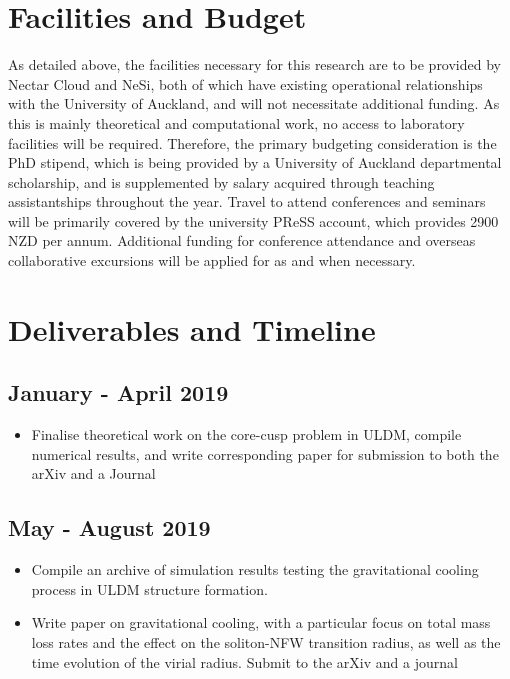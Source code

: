 \section{Facilities and Budget}

As detailed above, the facilities necessary for this research are to be provided by Nectar Cloud and NeSi, both of which have existing operational relationships with the University of Auckland, and will not necessitate additional funding. As this is mainly theoretical and computational work, no access to laboratory facilities will be required. Therefore, the primary budgeting consideration is the PhD stipend, which is being provided by a University of Auckland departmental scholarship, and is supplemented by salary acquired through teaching assistantships throughout the year. Travel to attend conferences and seminars will be primarily covered by the university PReSS account, which provides 2900 NZD per annum. Additional funding for conference attendance and overseas collaborative excursions will be applied for as and when necessary. 


\section{Deliverables and Timeline}

\subsection*{January - April 2019}
\begin{itemize}
    \item Finalise theoretical work on the core-cusp problem in ULDM, compile numerical results, and write corresponding paper for submission to both the arXiv and a Journal
\end{itemize}

\subsection*{May - August 2019}
\begin{itemize}
    \item Compile an archive of simulation results testing the gravitational cooling process in ULDM structure formation. 
    \item Write paper on gravitational cooling, with a particular focus on total mass loss rates and the effect on the soliton-NFW transition radius, as well as the time evolution of the virial radius. Submit to the arXiv and a journal
\end{itemize}

